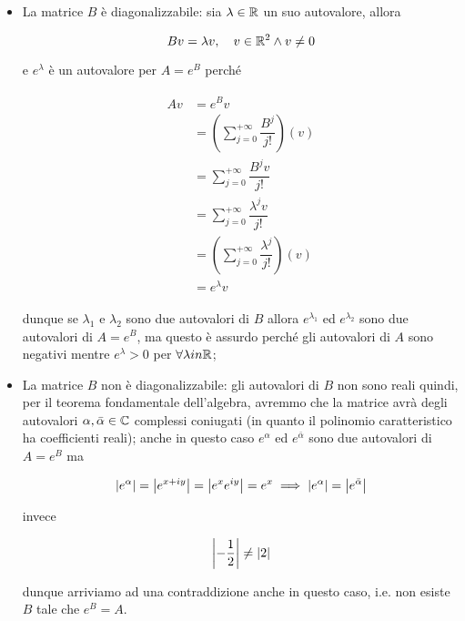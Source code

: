 \begin{itemize}
	\item La matrice $ B $ è diagonalizzabile: sia $ \lambda \in \mathbb{R} $ un suo autovalore, allora
	
	\begin{equation}
		B v = \lambda v \qcomma v \in \R^{2} \wedge v \neq 0
	\end{equation}

	e $ e^{\lambda} $ è un autovalore per $ A = e^{B} $ perché
	
	\begin{align}
		\begin{split}
			A v &= e^{B} v\\
			&= \left( \sum_{j=0}^{+\infty} \dfrac{B^{j}}{j!} \right) (v)\\
			&= \sum_{j=0}^{+\infty} \dfrac{B^{j} v}{j!}\\
			&= \sum_{j=0}^{+\infty} \dfrac{\lambda^{j} v}{j!}\\
			&= \left( \sum_{j=0}^{+\infty} \dfrac{\lambda^{j}}{j!} \right) (v)\\
			&= e^{\lambda} v
		\end{split}
	\end{align}

	dunque se $ \lambda_{1} $ e $ \lambda_{2} $ sono due autovalori di $ B $ allora $ e^{\lambda_{1}} $ ed $ e^{\lambda_{2}} $ sono due autovalori di $ A = e^{B} $, ma questo è assurdo perché gli autovalori di $ A $ sono negativi mentre $ e^{\lambda} > 0 $ per $ \forall \lambda in \mathbb{R} $;
	
	\item La matrice $ B $ non è diagonalizzabile: gli autovalori di $ B $ non sono reali quindi, per il teorema fondamentale dell'algebra, avremmo che la matrice avrà degli autovalori $ \alpha, \bar{\alpha} \in \mathbb{C} $ complessi coniugati (in quanto il polinomio caratteristico ha coefficienti reali); anche in questo caso $ e^{\alpha} $ ed $ e^{\bar{\alpha}} $ sono due autovalori di $ A = e^{B} $ ma
	
	\begin{equation}
		\abs{e^{\alpha}} = \abs{e^{x + i y}} = \abs{e^{x} e^{i y}} = e^{x} %
		\implies%
		\abs{e^{\alpha}} = \abs{e^{\bar{\alpha}}}
	\end{equation}

	invece
	
	\begin{equation}
		\abs{- \dfrac{1}{2}} \neq \abs{2}
	\end{equation}

	dunque arriviamo ad una contraddizione anche in questo caso, i.e. non esiste $ B $ tale che $ e^{B} = A $.
\end{itemize}

